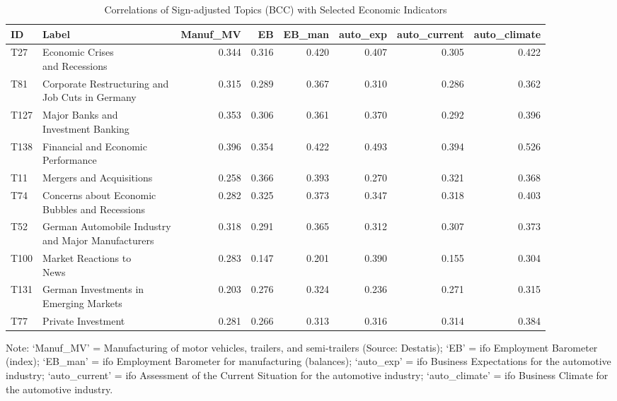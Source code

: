 \begin{table}[h!]
  \centering
  \begin{threeparttable}
    \scriptsize
    \renewcommand{\arraystretch}{1.3}
  \caption{Correlations of Sign-adjusted Topics (BCC) with Selected Economic Indicators}
  \label{tab:cor_gdp_topics_bcc_2009_200_all_economic_indicators}


\begin{tabular}{llrrrrrr}
\hline
ID & Label & Manuf\_MV & EB & EB\_man & auto\_exp & auto\_current & auto\_climate\\
\hline
T27 & \makecell[tl]{ Economic Crises \\ and Recessions} & 0.344 & 0.316 & 0.420 & 0.407 & 0.305 & 0.422\\
T81 & \makecell[tl]{ Corporate Restructuring and \\ Job Cuts in Germany} & 0.315 & 0.289 & 0.367 & 0.310 & 0.286 & 0.362\\
T127 & \makecell[tl]{ Major Banks and \\ Investment Banking} & 0.353 & 0.306 & 0.361 & 0.370 & 0.292 & 0.396\\
T138 & \makecell[tl]{ Financial and Economic \\ Performance} & 0.396 & 0.354 & 0.422 & 0.493 & 0.394 & 0.526\\
T11 & Mergers and Acquisitions & 0.258 & 0.366 & 0.393 & 0.270 & 0.321 & 0.368\\
\addlinespace
T74 & \makecell[tl]{ Concerns about Economic\\ Bubbles and Recessions} & 0.282 & 0.325 & 0.373 & 0.347 & 0.318 & 0.403\\
T52 & \makecell[tl]{ German Automobile Industry \\ and Major Manufacturers} & 0.318 & 0.291 & 0.365 & 0.312 & 0.307 & 0.373\\
T100 & \makecell[tl]{ Market Reactions to \\News} & 0.283 & 0.147 & 0.201 & 0.390 & 0.155 & 0.304\\
T131 & \makecell[tl]{German Investments in \\ Emerging Markets} & 0.203 & 0.276 & 0.324 & 0.236 & 0.271 & 0.315\\
T77 & Private Investment & 0.281 & 0.266 & 0.313 & 0.316 & 0.314 & 0.384\\
\hline
\end{tabular}

    \begin{tablenotes}[flushleft]
      \small \item Note: ‘Manuf\_MV’ = Manufacturing of motor vehicles, trailers, and semi-trailers (Source: Destatis); ‘EB’ = ifo Employment Barometer (index); ‘EB\_man’ = ifo Employment Barometer for manufacturing (balances); ‘auto\_exp’ = ifo Business Expectations for the automotive industry; ‘auto\_current’ = ifo Assessment of the Current Situation for the automotive industry; ‘auto\_climate’ = ifo Business Climate for the automotive industry.
    \end{tablenotes}
  \end{threeparttable}
\end{table}

